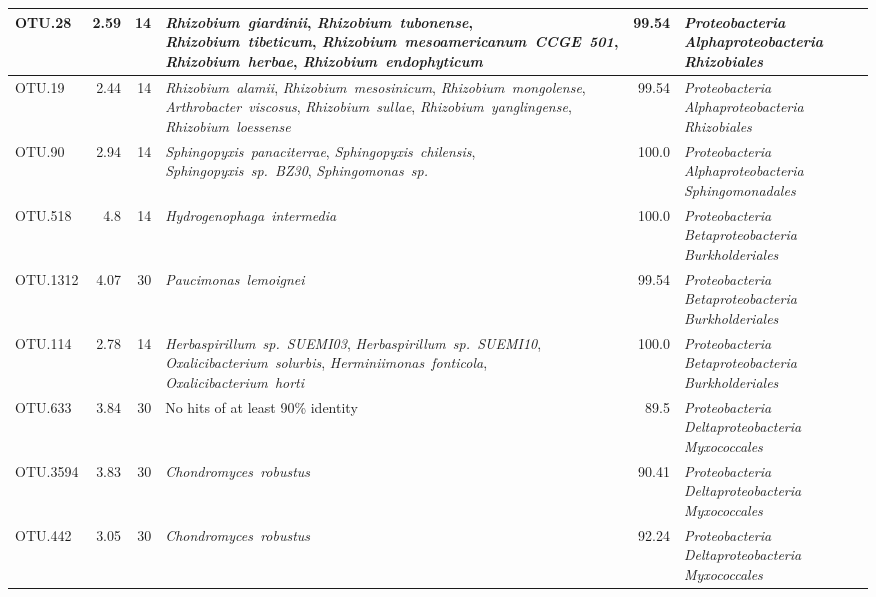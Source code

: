 \begin{ThreePartTable}
\begin{longtable}{lrrP{5cm}rP{5cm}}
OTU.28 & 2.59 & 14 & \mbox{\textit{Rhizobium giardinii}}, \mbox{\textit{Rhizobium tubonense}}, \mbox{\textit{Rhizobium tibeticum}}, \mbox{\textit{Rhizobium mesoamericanum CCGE 501}}, \mbox{\textit{Rhizobium herbae}}, \mbox{\textit{Rhizobium endophyticum}} & 99.54 & \mbox{\textit{Proteobacteria}} \mbox{\textit{Alphaproteobacteria}} \mbox{\textit{Rhizobiales}} \\ \midrule
OTU.19 & 2.44 & 14 & \mbox{\textit{Rhizobium alamii}}, \mbox{\textit{Rhizobium mesosinicum}}, \mbox{\textit{Rhizobium mongolense}}, \mbox{\textit{Arthrobacter viscosus}}, \mbox{\textit{Rhizobium sullae}}, \mbox{\textit{Rhizobium yanglingense}}, \mbox{\textit{Rhizobium loessense}} & 99.54 & \mbox{\textit{Proteobacteria}} \mbox{\textit{Alphaproteobacteria}} \mbox{\textit{Rhizobiales}} \\ \midrule
OTU.90 & 2.94 & 14 & \mbox{\textit{Sphingopyxis panaciterrae}}, \mbox{\textit{Sphingopyxis chilensis}}, \mbox{\textit{Sphingopyxis sp. BZ30}}, \mbox{\textit{Sphingomonas sp.}} & 100.0 & \mbox{\textit{Proteobacteria}} \mbox{\textit{Alphaproteobacteria}} \mbox{\textit{Sphingomonadales}} \\ \midrule
OTU.518 & 4.8 & 14 & \mbox{\textit{Hydrogenophaga intermedia}} & 100.0 & \mbox{\textit{Proteobacteria}} \mbox{\textit{Betaproteobacteria}} \mbox{\textit{Burkholderiales}} \\ \midrule
OTU.1312 & 4.07 & 30 & \mbox{\textit{Paucimonas lemoignei}} & 99.54 & \mbox{\textit{Proteobacteria}} \mbox{\textit{Betaproteobacteria}} \mbox{\textit{Burkholderiales}} \\ \midrule
OTU.114 & 2.78 & 14 & \mbox{\textit{Herbaspirillum sp. SUEMI03}}, \mbox{\textit{Herbaspirillum sp. SUEMI10}}, \mbox{\textit{Oxalicibacterium solurbis}}, \mbox{\textit{Herminiimonas fonticola}}, \mbox{\textit{Oxalicibacterium horti}} & 100.0 & \mbox{\textit{Proteobacteria}} \mbox{\textit{Betaproteobacteria}} \mbox{\textit{Burkholderiales}} \\ \midrule
OTU.633 & 3.84 & 30 & {No hits of at least 90\% identity} & 89.5 & \mbox{\textit{Proteobacteria}} \mbox{\textit{Deltaproteobacteria}} \mbox{\textit{Myxococcales}} \\ \midrule
OTU.3594 & 3.83 & 30 & \mbox{\textit{Chondromyces robustus}} & 90.41 & \mbox{\textit{Proteobacteria}} \mbox{\textit{Deltaproteobacteria}} \mbox{\textit{Myxococcales}} \\ \midrule
OTU.442 & 3.05 & 30 & \mbox{\textit{Chondromyces robustus}} & 92.24 & \mbox{\textit{Proteobacteria}} \mbox{\textit{Deltaproteobacteria}} \mbox{\textit{Myxococcales}} \\ \midrule

\end{longtable}
\end{ThreePartTable}
